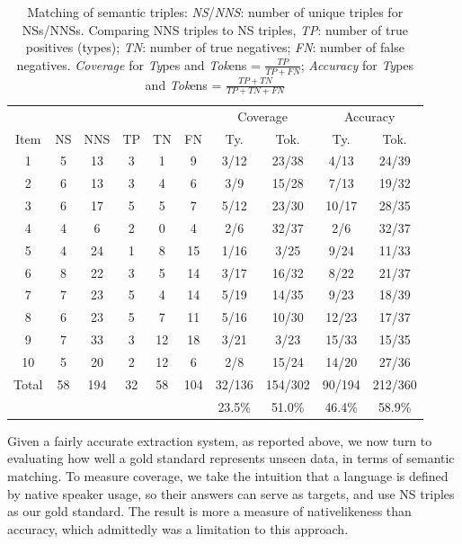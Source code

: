 \begin{table}[htb!]
\begin{center}
\begin{tabular}{|c||c|c||c|c|c||cc|cc|}
\hline
  & & & & & & \multicolumn{2}{c|}{Coverage} & \multicolumn{2}{c|}{Accuracy}\\
 Item & NS & NNS & TP & TN & FN & Ty. & Tok. & Ty. & Tok.\\
\hline
\hline
1 & 5 & 13 & 3 & 1 & 9 & 3/12 & 23/38 & 4/13 & 24/39 \\%
\hline
2 & 6 & 13 & 3 & 4 & 6 & 3/9 & 15/28 & 7/13 & 19/32 \\%
\hline
3 & 6 & 17 & 5 & 5 & 7 & 5/12 & 23/30 & 10/17 & 28/35 \\%
\hline
4 & 4 & 6 & 2 & 0 & 4 & 2/6 & 32/37 & 2/6 & 32/37 \\%
\hline
5 & 4 & 24 & 1 & 8 & 15 & 1/16 & 3/25 & 9/24 & 11/33 \\%
\hline
6 & 8 & 22 & 3 & 5 & 14 & 3/17 & 16/32 & 8/22 & 21/37 \\%
\hline
7 & 7 & 23 & 5 & 4 & 14 & 5/19 & 14/35 & 9/23 & 18/39 \\%
\hline
8 & 6 & 23 & 5 & 7 & 11 & 5/16 & 10/30 & 12/23 & 17/37 \\%
\hline
9 & 7 & 33 & 3 & 12 & 18 & 3/21 & 3/23 & 15/33 & 15/35 \\%
\hline
10 & 5 & 20 & 2 & 12 & 6 & 2/8 & 15/24 & 14/20 & 27/36 \\%
\hline
\hline
Total & 58 & 194 & 32 & 58 & 104 & 32/136 & 154/302 & 90/194 & 212/360\\%
      &    &     &    &    &     & 23.5\% & 51.0\% & 46.4\% & 58.9\%\\%
\hline
\end{tabular}
\end{center}
\caption{Matching of semantic triples: \emph{NS}/\emph{NNS}: number of
  unique triples for NSs/NNSs. Comparing NNS triples to NS triples,
  \emph{TP}: number of true positives (types); \emph{TN}: number of
  true negatives; \emph{FN}: number of false negatives.
  \emph{Coverage} for \emph{Ty}pes and \emph{Tok}ens =
  $\frac{TP}{TP+FN}$; \emph{Accuracy} for \emph{Ty}pes and
  \emph{Tok}ens = $\frac{TP+TN}{TP+TN+FN}$}

\label{tab:triple-coverage}
\end{table}

Given a fairly accurate extraction system, as reported above, we now
turn to evaluating how well a gold standard represents unseen data, in
terms of semantic matching.  To measure coverage, we take the
intuition that a language is defined by native speaker usage, so their
answers can serve as targets, and use NS triples as our gold standard. The result is more a measure of nativelikeness than accuracy, which admittedly was a limitation to this approach.

